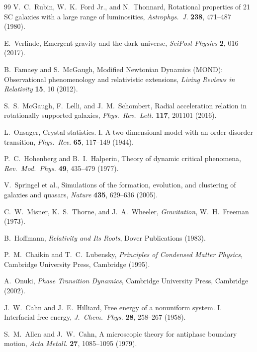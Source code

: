 \documentclass[11pt, a4paper, twocolumn]{article}
\begin{document}
{\begin{thebibliography}{99}
V.~C.~Rubin, W.~K.~Ford Jr., and N.~Thonnard,
\newblock Rotational properties of 21 SC galaxies with a large range of
luminosities,
\newblock \emph{Astrophys.\ J.} \textbf{238}, 471--487 (1980).

E.~Verlinde,
\newblock Emergent gravity and the dark universe,
\newblock \emph{SciPost Physics} \textbf{2}, 016 (2017).

B.~Famaey and S.~McGaugh,
\newblock Modified Newtonian Dynamics (MOND): Observational phenomenology and
relativistic extensions,
\newblock \emph{Living Reviews in Relativity} \textbf{15}, 10 (2012).

S.~S.~McGaugh, F.~Lelli, and J.~M.~Schombert,
\newblock Radial acceleration relation in rotationally supported galaxies,
\newblock \emph{Phys.\ Rev.\ Lett.} \textbf{117}, 201101 (2016).

L.~Onsager,
\newblock Crystal statistics. I. A two-dimensional model with an order-disorder
transition,
\newblock \emph{Phys.\ Rev.} \textbf{65}, 117--149 (1944).

P.~C.~Hohenberg and B.~I.~Halperin,
\newblock Theory of dynamic critical phenomena,
\newblock \emph{Rev.\ Mod.\ Phys.} \textbf{49}, 435--479 (1977).

V.~Springel et al.,
\newblock Simulations of the formation, evolution, and clustering of galaxies
and quasars,
\newblock \emph{Nature} \textbf{435}, 629--636 (2005).

C.~W.~Misner, K.~S.~Thorne, and J.~A.~Wheeler,
\newblock \emph{Gravitation},
\newblock W.~H.~Freeman (1973).

B.~Hoffmann,
\newblock \emph{Relativity and Its Roots},
\newblock Dover Publications (1983).

P.~M.~Chaikin and T.~C.~Lubensky,
\newblock \emph{Principles of Condensed Matter Physics},
\newblock Cambridge University Press, Cambridge (1995).

A.~Onuki,
\newblock \emph{Phase Transition Dynamics},
\newblock Cambridge University Press, Cambridge (2002).

J.~W.~Cahn and J.~E.~Hilliard,
\newblock Free energy of a nonuniform system. I. Interfacial free energy,
\newblock \emph{J.\ Chem.\ Phys.} \textbf{28}, 258--267 (1958).

S.~M.~Allen and J.~W.~Cahn,
\newblock A microscopic theory for antiphase boundary motion,
\newblock \emph{Acta Metall.} \textbf{27}, 1085--1095 (1979).


\end{thebibliography}}
\end{document}
